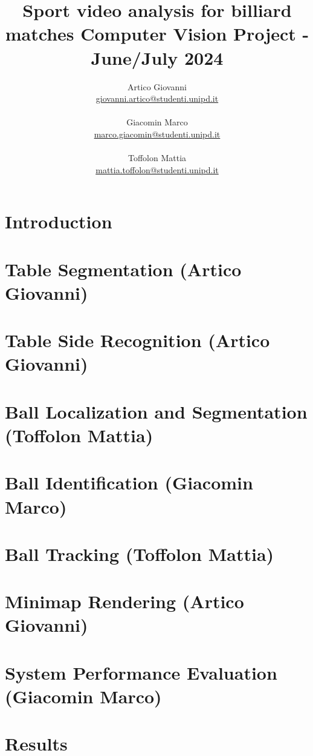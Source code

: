\documentclass{article}
\title{\huge \textbf{Sport video analysis for billiard matches} \newline \Large Computer Vision Project - June/July 2024
}
\author{Artico Giovanni \\ \href{mailto:giovanni.artico@studenti.unipd.it}{giovanni.artico@studenti.unipd.it} \\ \\
        Giacomin Marco \\  \href{mailto:marco.giacomin@studenti.unipd.it}{marco.giacomin@studenti.unipd.it} \\ \\
        Toffolon Mattia \\ \href{mailto:mattia.toffolon@studenti.unipd.it}{mattia.toffolon@studenti.unipd.it}}
\date{}
\begin{document}
\maketitle
\vspace{10mm}
\tableofcontents

\newpage

\section{Introduction}


\section{Table Segmentation (Artico Giovanni)}


\section{Table Side Recognition (Artico Giovanni)}


\section{Ball Localization and Segmentation (Toffolon Mattia)}


\section{Ball Identification (Giacomin Marco)}


\section{Ball Tracking (Toffolon Mattia)}


\section{Minimap Rendering (Artico Giovanni)}


\section{System Performance Evaluation (Giacomin Marco)}
\label{sec:performance}


\section{Results}
% 
\end{document}
